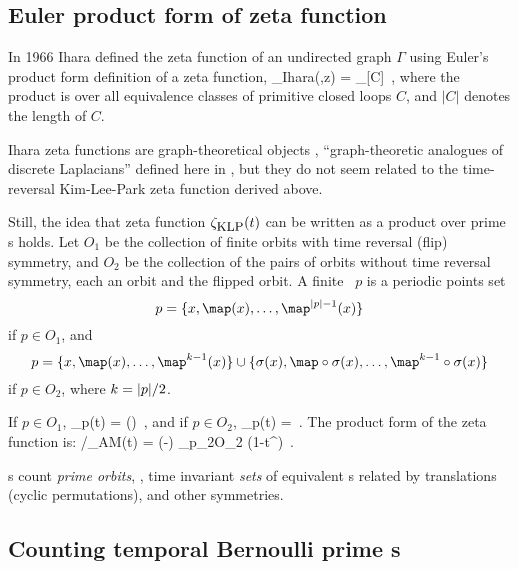 \subsection{Euler product form of zeta function }
\label{sect:KiLePaEuler}

In 1966 Ihara defined the zeta function of an undirected
graph $\Gamma$ using Euler's product form definition of a zeta function,
\beq
\zeta_{\mbox{\footnotesize Ihara}}(\Gamma,z) =
        \prod_{[C]}
\,,
where the product is over all equivalence classes of primitive closed
loops $C$, and $|C|$ denotes the length of $C$.

Ihara zeta functions are graph-theoretical objects%
,
``graph-theoretic analogues of discrete Laplacians''
defined here in , but they do not seem related to
the time-reversal Kim-Lee-Park zeta function
 derived above.

Still,  the idea that zeta function
$\zeta_{\mbox{\footnotesize KLP}}(t)$ can be written as a product over
prime {\orbit}s holds. Let $O_1$ be the collection of finite orbits with time
reversal (flip) symmetry, and $O_2$ be the collection of the pairs of
orbits without time reversal symmetry, each an orbit and the flipped
orbit. A finite \orbit\ $p$ is a periodic points set
\[
p = \{\ssp, \map(\ssp), \dots, \map^{\cl{p}-1}(\ssp)\}
\]
if $p \in O_1$, and
\[
p = \{\ssp, \map(\ssp), \dots, \map^{k-1}(\ssp)\} \cup
\{\Refl(\ssp), \map\circ\Refl(\ssp), \dots, \map^{k-1}\circ\Refl(\ssp)\}
\]
if $p \in O_2$, where $k=\cl{p}/2$.

If $p \in O_1$,
\beq
\zeta_{p}(t) =
\exp\left(\right)
\,,
and if $p \in O_2$,
\beq
\zeta_{p}(t) =
\,.
The product form of the zeta function is:
/\zeta_{\mbox{\footnotesize AM}}(t) =
      \;\exp\left(-\right)
\prod_{p_2\in O_2} (1-t^{})
\,.

\Tzeta s count {\em prime
orbits}, \ie, time invariant \emph{sets} of equivalent {\lattstate}s
related by translations (cyclic permutations), and other
symmetries.

\newpage %
\subsection{Counting {temporal Bernoulli} prime \po s}
\label{s:bernPrime}

